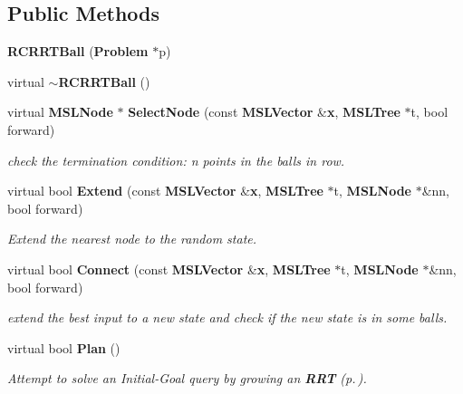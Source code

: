 \subsection*{Public Methods}
\begin{CompactItemize}
\item 
{\bf RCRRTBall} ({\bf Problem} $\ast$p)
\item 
virtual {\bf $\sim$RCRRTBall} ()
\item 
virtual {\bf MSLNode} $\ast$ {\bf Select\-Node} (const {\bf MSLVector} \&{\bf x}, {\bf MSLTree} $\ast$t, bool forward)
\begin{CompactList}\small\item\em check the termination condition: n points in the balls in row.\item\end{CompactList}\item 
virtual bool {\bf Extend} (const {\bf MSLVector} \&{\bf x}, {\bf MSLTree} $\ast$t, {\bf MSLNode} $\ast$\&nn, bool forward)
\begin{CompactList}\small\item\em Extend the nearest node to the random state.\item\end{CompactList}\item 
virtual bool {\bf Connect} (const {\bf MSLVector} \&{\bf x}, {\bf MSLTree} $\ast$t, {\bf MSLNode} $\ast$\&nn, bool forward)
\begin{CompactList}\small\item\em extend the best input to a new state and check if the new state is in some balls.\item\end{CompactList}\item 
virtual bool {\bf Plan} ()
\begin{CompactList}\small\item\em Attempt to solve an Initial-Goal query by growing an {\bf RRT} {\rm (p.\,\pageref{classRRT})}.\item\end{CompactList}\end{CompactItemize}
